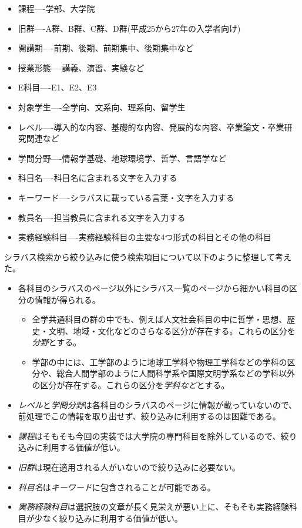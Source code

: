 \begin{itemize}
  \item 課程----学部、大学院
  \item 旧群----A群、B群、C群、D群(平成25から27年の入学者向け)
  \item 開講期----前期、後期、前期集中、後期集中など
  \item 授業形態----講義、演習、実験など
  \item E科目----E1、E2、E3
  \item 対象学生----全学向、文系向、理系向、留学生
  \item レベル----導入的な内容、基礎的な内容、発展的な内容、卒業論文・卒業研究関連など
  \item 学問分野----情報学基礎、地球環境学、哲学、言語学など
  \item 科目名----科目名に含まれる文字を入力する
  \item キーワード----シラバスに載っている言葉・文字を入力する
  \item 教員名----担当教員に含まれる文字を入力する
  \item 実務経験科目----実務経験科目の主要な4つ形式の科目とその他の科目
\end{itemize}

シラバス検索から絞り込みに使う検索項目について以下のように整理して考えた。\\

\begin{itemize}
  \item 各科目のシラバスのページ以外にシラバス一覧のページから細かい科目の区分の情報が得られる。
  \begin{itemize}
    \item 全学共通科目の群の中でも、例えば人文社会科目の中に哲学・思想、歴史・文明、地域・文化などのさらなる区分が存在する。これらの区分を\emph{分野}とする。
    \item 学部の中には、工学部のように地球工学科や物理工学科などの学科の区分や、総合人間学部のように人間科学系や国際文明学系などの学科以外の区分が存在する。これらの区分を\emph{学科など}とする。
  \end{itemize}
  \item \emph{レベル}と\emph{学問分野}は各科目のシラバスのページに情報が載っていないので、前処理でこの情報を取り出せず、絞り込みに利用するのは困難である。
  \item \emph{課程}はそもそも今回の実装では大学院の専門科目を除外しているので、絞り込みに利用する価値が低い。
  \item \emph{旧群}は現在適用される人がいないので絞り込みに必要ない。
  \item \emph{科目名}は\emph{キーワード}に包含されることが可能である。
  \item \emph{実務経験科目}は選択肢の文章が長く見栄えが悪い上に、そもそも実務経験科目が少なく絞り込みに利用する価値が低い。
\end{itemize}

